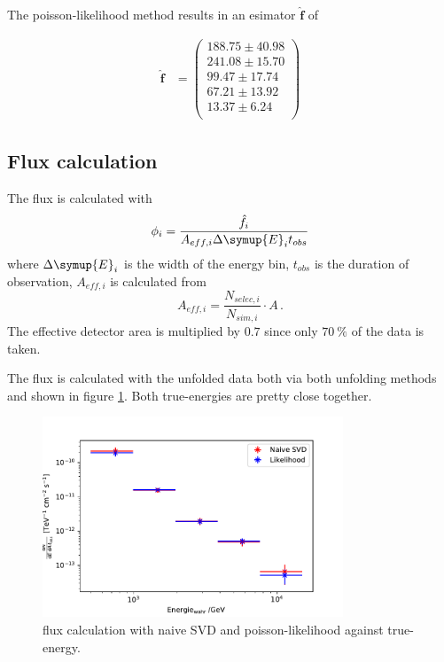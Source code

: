 The poisson-likelihood method results in an esimator $\hat{\symbf{f}}$ of 

\begin{align}
\hat{\symbf{f}} &= 
\begin{pmatrix}
     188.75 \pm 40.98 \\
     241.08 \pm 15.70 \\
     99.47 \pm 17.74 \\
     67.21 \pm 13.92 \\ 
     13.37 \pm 6.24 \\
\end{pmatrix}
\end{align}

\subsection{Flux calculation}

The flux is calculated with
\begin{equation}
  \phi_i = \frac{\hat{f}_i}{A_{eff,i} \Delta\symup{E}_i t_{obs}}
  \label{eqn:flux}
\end{equation}
where $\Delta\symup{E}_i$ is the width of the energy bin, $t_{obs}$ is the duration of observation, $A_{eff,i}$ is calculated from
\begin{equation}
  A_{eff,i} = \frac{N_{selec, i}}{N_{sim, i}} \cdot A\,.
\end{equation}
The effective detector area is multiplied by $0.7$ since only $\SI{70}{\percent}$ of the data is taken.

The flux is calculated with the unfolded data both via both unfolding methods and shown in figure \ref{fig:fluxBoth}.
Both true-energies are pretty close together.

\begin{figure}[H]
  \centering
  \includegraphics[width=0.8\textwidth]{plots/Fluss.pdf}
  \caption{flux calculation with naive SVD and poisson-likelihood against true-energy.}
  \label{fig:fluxBoth}
\end{figure}

